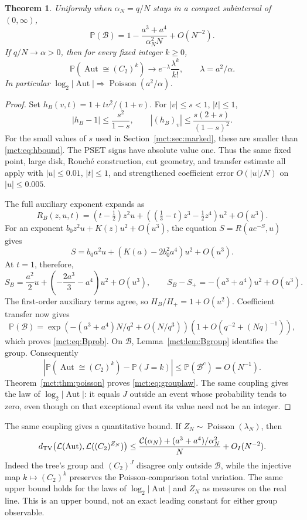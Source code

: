 \documentclass[11pt]{article}
\newtheorem{theorem}{Theorem}[section]
\theoremstyle{definition}
\newcommand{\Aut}{\operatorname{Aut}}
\newcommand{\Prob}{\mathbb P}
\newcommand{\classB}{\mathcal B}
\begin{document}
\begin{theorem}\label{mct:thm:B}
Uniformly when $\alpha_N=q/N$ stays in a compact subinterval of $(0,\infty)$,
\begin{equation}\label{mct:eq:Bprob}
 \Prob(\classB)=1-\frac{a^3+a^4}{\alpha_N^2N}+O(N^{-2}).
\end{equation}
If $q/N\to\alpha>0$, then for every fixed integer $k\ge0$,
\begin{equation}\label{mct:eq:grouplaw}
 \Prob(\Aut\cong(C_2)^k)\longrightarrow
 e^{-\lambda}\frac{\lambda^k}{k!},\qquad \lambda=a^2/\alpha.
\end{equation}
In particular $\log_2|\Aut|\Longrightarrow\operatorname{Poisson}(a^2/\alpha)$.
\end{theorem}
\begin{proof}
Set $h_B(v,t)=1+tv^2/(1+v)$. For $|v|\le s<1$, $|t|\le1$,
\[
 |h_B-1|\le\frac{s^2}{1-s},\qquad
 |(h_B)_v|\le\frac{s(2+s)}{(1-s)^2}.
\]
For the small values of $s$ used in Section~\ref{mct:sec:marked}, these are smaller than \eqref{mct:eq:hbound}. The PSET signs have absolute value one. Thus the same fixed point, large disk, Rouch\'e construction, cut geometry, and transfer estimate all apply with $|u|\le0.01$, $|t|\le1$, and strengthened coefficient error $O(|u|/N)$ on $|u|\le0.005$.

The full auxiliary exponent expands as
\[
 R_B(z,u,t)=(t-\tfrac12)z^2u+\left((\tfrac13-t)z^3-\tfrac12z^4\right)u^2+O(u^3).
\]
For an exponent $b_0z^2u+K(z)u^2+O(u^3)$, the equation $S=R(ae^{-S},u)$ gives
\[
 S=b_0a^2u+(K(a)-2b_0^2a^4)u^2+O(u^3).
\]
At $t=1$, therefore,
\[
 S_B=\frac{a^2}2u+\left(-\frac{2a^3}3-a^4\right)u^2+O(u^3),
 \qquad S_B-S_+=-(a^3+a^4)u^2+O(u^3).
\]
The first-order auxiliary terms agree, so $H_B/H_+=1+O(u^2)$. Coefficient transfer now gives
\[
 \Prob(\classB)=\exp\left(-(a^3+a^4)N/q^2+O(N/q^3)\right)
           \left(1+O(q^{-2}+(Nq)^{-1})\right),
\]
which proves \eqref{mct:eq:Bprob}. On $\classB$, Lemma~\ref{mct:lem:Bgroup} identifies the group. Consequently
\[
 \left|\Prob(\Aut\cong(C_2)^k)-\Prob(J=k)\right|\le\Prob(\classB^c)=O(N^{-1}).
\]
Theorem~\ref{mct:thm:poisson} proves \eqref{mct:eq:grouplaw}. The same coupling gives the law of $\log_2|\Aut|$: it equals $J$ outside an event whose probability tends to zero, even though on that exceptional event its value need not be an integer.
\end{proof}
The same coupling gives a quantitative bound. If $Z_N\sim\operatorname{Poisson}(\lambda_N)$, then
\begin{align}\label{mct:eq:groupTV}
 d_{\rm TV}\bigl(\mathcal L(\Aut),\mathcal L((C_2)^{Z_N})\bigr)
 \le \frac{\mathcal C(\alpha_N)+(a^3+a^4)/\alpha_N^2}{N}+O_I(N^{-2}).
\end{align}
Indeed the tree's group and $(C_2)^J$ disagree only outside $\classB$, while the injective map $k\mapsto(C_2)^k$ preserves the Poisson-comparison total variation. The same upper bound holds for the laws of $\log_2|\Aut|$ and $Z_N$ as measures on the real line. This is an upper bound, not an exact leading constant for either group observable.
\end{document}
